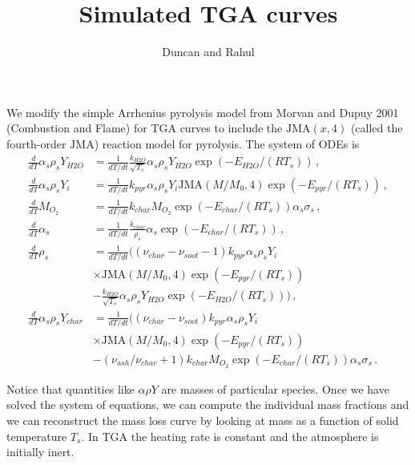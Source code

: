 \documentclass[reqno]{amsart}
\title{Simulated TGA curves}
\author{Duncan and Rahul}
\newcommand{\JMA}{\text{JMA}}
\begin{document}
\maketitle

We modify the simple Arrhenius pyrolysis model from Morvan and Dupuy 2001 (Combustion and Flame) for TGA curves to include the $\JMA(x,4)$ (called the fourth-order $\JMA$) reaction model for pyrolysis. 
The system of ODEs is 
\begin{align}
\frac{d}{dT} \alpha_s \rho_s Y_{H2O} &=\frac{1}{dT/dt}\frac{k_{H2O}}{\sqrt{T_s}} \alpha_s\rho_s Y_{H2O} \exp(-E_{H2O}/(RT_s)) \,,\\
\frac{d}{dT} \alpha_s \rho_s Y_{i} &=\frac{1}{dT/dt}k_{pyr}\alpha_s\rho_s Y_i \JMA(M/M_0,4) \exp(-E_{pyr}/(RT_s)) \,,\\
\frac{d}{dT} M_{O_2} &=\frac{1}{dT/dt}k_{char} M_{O_2} \exp(-E_{char}/(RT_s))\alpha_s \sigma_s \,,\\
\frac{d}{dT} \alpha_s &=\frac{1}{dT/dt}\frac{k_{char}}{\rho_s}\alpha_s \exp(-E_{char}/(RT_s)) \,,\\
\frac{d}{dT} \rho_s &=\frac{1}{dT/dt}\big((\nu_{char}-\nu_{soot}-1) k_{pyr} \alpha_s \rho_s Y_i \nonumber \\ &\times \JMA(M/M_0,4) \exp(-E_{pyr}/(RT_s)) \nonumber \\
                    & -\frac{k_{H2O}}{\sqrt{T_s}} \alpha_s\rho_s Y_{H2O} \exp(-E_{H2O}/(RT_s))\big) \,,\\
\frac{d}{dT} \alpha_s \rho_s Y_{char} &=\frac{1}{dT/dt}\big( (\nu_{char}-\nu_{soot}) k_{pyr}\alpha_s\rho_s Y_i \nonumber \\ &\times \JMA(M/M_0,4) \exp(-E_{pyr}/(RT_s)) \nonumber \\
&-(\nu_{ash}/\nu_{char}+1) k_{char} M_{O_2} \exp(-E_{char}/(RT_s))\alpha_s \sigma_s \,.
\label{eqn:TGAmodel}
\end{align}

Notice that quantities like $\alpha\rho Y$ are masses of particular species. 
Once we have solved the system of equations, we can compute the individual mass fractions and we can reconstruct the mass loss curve by looking at mass as a function of solid temperature $T_s$. 
In TGA the heating rate is constant and the atmosphere is initially inert.
\end{document}
